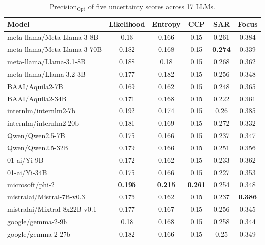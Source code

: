 \begin{table*}[t]
    \centering
    \small 
    \begin{tabular}{lccccc}
        \toprule
        Model & Likelihood & Entropy & CCP & SAR & Focus \\
\midrule
meta-llama/Meta-Llama-3-8B & 0.18 & 0.166 & 0.15 & 0.261 & 0.384 \\
meta-llama/Meta-Llama-3-70B & 0.182 & 0.168 & 0.15 & \textbf{0.274} & 0.339 \\
meta-llama/Llama-3.1-8B & 0.188 & 0.18 & 0.15 & 0.268 & 0.362 \\
meta-llama/Llama-3.2-3B & 0.177 & 0.182 & 0.15 & 0.256 & 0.348 \\
BAAI/Aquila2-7B & 0.169 & 0.162 & 0.15 & 0.248 & 0.365 \\
BAAI/Aquila2-34B & 0.171 & 0.168 & 0.15 & 0.222 & 0.361 \\
internlm/internlm2-7b & 0.192 & 0.174 & 0.15 & 0.26 & 0.385 \\
internlm/internlm2-20b & 0.181 & 0.169 & 0.15 & 0.272 & 0.332 \\
Qwen/Qwen2.5-7B & 0.175 & 0.166 & 0.15 & 0.237 & 0.347 \\
Qwen/Qwen2.5-32B & 0.179 & 0.166 & 0.15 & 0.251 & 0.356 \\
01-ai/Yi-9B & 0.172 & 0.162 & 0.15 & 0.233 & 0.362 \\
01-ai/Yi-34B & 0.175 & 0.166 & 0.15 & 0.227 & 0.353 \\
microsoft/phi-2 & \textbf{0.195} & \textbf{0.215} & \textbf{0.261} & 0.254 & 0.348 \\
mistralai/Mistral-7B-v0.3 & 0.176 & 0.162 & 0.15 & 0.237 & \textbf{0.386} \\
mistralai/Mixtral-8x22B-v0.1 & 0.177 & 0.167 & 0.15 & 0.256 & 0.345 \\
google/gemma-2-9b & 0.18 & 0.168 & 0.15 & 0.258 & 0.344 \\
google/gemma-2-27b & 0.182 & 0.166 & 0.15 & 0.25 & 0.349 \\
        \bottomrule
    \end{tabular}
    \caption{
     $\mathrm{Precision}_\mathrm{Opt}$ of five uncertainty scores across 17 LLMs.
    }
    \label{tb:precission_opt_17models}
\end{table*}